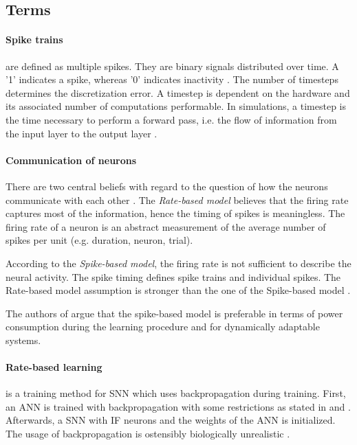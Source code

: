 \newcommand\rbModel{Rate-based model}
\newcommand\sbModel{Spike-based model}
\subsection{Terms}
\label{subsec:terms}

\paragraph{\textbf{Spike trains}}
are defined as multiple spikes.
They are binary signals distributed over time.
A '1' indicates a spike, whereas '0' indicates inactivity \cite{DIET_SNN}.
The number of timesteps determines the discretization error.
A timestep is dependent on the hardware and its associated number of computations performable.
In simulations, a timestep is the time necessary to perform a forward pass, i.e. the flow of information from the input layer to the output layer \cite{DIET_SNN}.
%
\paragraph{\textbf{Communication of neurons}}
There are two central beliefs with regard to the question of how the neurons communicate with each other \cite{spike_vs_rate}.
The \textit{\rbModel{}} believes that the firing rate captures most of the information, hence the timing of spikes is meaningless.
The firing rate of a neuron is an abstract measurement of the average number of spikes per unit (e.g. duration, neuron, trial).

According to the \textit{\sbModel{}}, the firing rate is not sufficient to describe the neural activity.
The spike timing defines spike trains and individual spikes.
The \rbModel{} assumption is stronger than the one of the \sbModel{} \cite{spike_vs_rate}.

The authors of \cite{SNN} argue that the spike-based model is preferable in terms of power consumption 
during the learning procedure and for dynamically adaptable systems.
%
\paragraph{\textbf{Rate-based learning}} is a training method for \ac{SNN} which uses backpropagation during training. 
First, an \ac{ANN} is trained with backpropagation with some restrictions as stated in \cite{DIET_SNN} and \cite{ANN_SNN_conversion}.
Afterwards, a \ac{SNN} with \ac{IF} neurons and the weights of the \ac{ANN} is initialized.
The usage of backpropagation is ostensibly biologically unrealistic \cite{SNN,STDP_like}.
